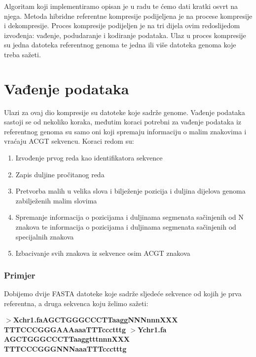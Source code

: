 Algoritam koji implementiramo opisan je u radu \cite{hrcm} te ćemo dati kratki osvrt na njega. Metoda hibridne referentne kompresije podijeljena je na procese kompresije i dekompresije. Proces kompresije podijeljen je na tri dijela ovim redoslijedom izvođenja: vađenje, podudaranje i kodiranje podataka. Ulaz u proces kompresije su jedna datoteka referentnog genoma te jedna ili više datoteka genoma koje treba sažeti. 

\section{Vađenje podataka}
Ulazi za ovaj dio kompresije su datoteke koje sadrže genome. Vađenje podataka sastoji se od nekoliko koraka, međutim koraci potrebni za vađenje podataka iz referentnog genoma su samo oni koji spremaju informaciju o malim znakovima i vraćaju ACGT sekvencu. Koraci redom su:
\begin{enumerate}[label=(\roman*)]
 \item Izvođenje prvog reda kao identifikatora sekvence
 \item Zapis duljine pročitanog reda
 \item Pretvorba malih u velika slova i bilježenje pozicija i duljina dijelova genoma zabilježenih malim slovima
 \item Spremanje informacija o pozicijama i duljinama segmenata sačinjenih od N znakova te informacija o pozicijama i duljinama segmenata sačinjenih od specijalnih znakova
 \item Izbacivanje svih znakova iz sekvence osim ACGT znakova
\end{enumerate}
\pagebreak
\subsubsection{Primjer}
Dobijemo dvije FASTA datoteke koje sadrže sljedeće sekvence od kojih je prva referentna, a druga sekvenca koju želimo sažeti:\newline

\begin{minipage}{10cm}
	\textbf{$>$Xchr1.fa\newline \quad AGCTGGGCCCTTaaggNNNnnnXXX\newline
	TTTCCCGGGAAAaaaTTTccctttg\newline
	$>$Ychr1.fa\newline
	AGCTGGGCCCTTaaggtttnnnXXX\newline
	TTTCCCGGGNNNaaaTTTccctttg\newline}
\end{minipage}

